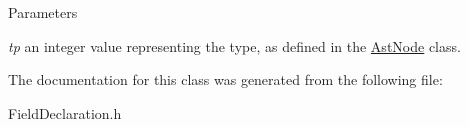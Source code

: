 \begin{DoxyParams}{Parameters}
\item[{\em tp}]an integer value representing the type, as defined in the \hyperlink{classAstNode}{AstNode} class. \end{DoxyParams}


The documentation for this class was generated from the following file:\begin{DoxyCompactItemize}
\item 
FieldDeclaration.h\end{DoxyCompactItemize}
